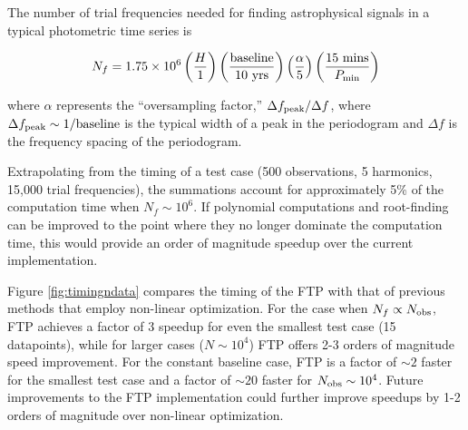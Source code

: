 \documentclass[apj]{emulateapj}
\begin{document}
The number of trial frequencies needed for finding astrophysical signals in a typical photometric time series is

\begin{equation}
    N_f = 1.75 \times 10^6 \left(\frac{H}{1}\right)\left(\frac{{\rm baseline}}{10~{\rm yrs}}\right)\left(\frac{\alpha}{5}\right)\left(\frac{15~{\rm mins}}{P_{\rm min}}\right)
\end{equation}

\noindent where $\alpha$ represents the ``oversampling factor,'' $\Delta f_{\rm peak} / \Delta f$, where $\Delta f_{\rm peak} \sim 1/{\rm baseline}$ is
the typical width of a peak in the periodogram and $\Delta f$ is the frequency spacing of the periodogram.

Extrapolating from the timing of a test case (500 observations, 5 harmonics, 15,000 trial frequencies), the summations
account for approximately 5\% of the computation time when $N_f \sim 10^6$. If polynomial computations and
root-finding can be improved to the point where they no longer dominate the computation time, this would provide an
order of magnitude speedup over the current implementation.

Figure \ref{fig:timingndata} compares the timing of the FTP with that of previous methods that employ
non-linear optimization. For the case when $N_f\propto N_{\rm obs}$, FTP achieves a factor of 3 speedup for even
the smallest test case (15 datapoints), while for larger cases ($N\sim10^4$) FTP offers 2-3 orders of magnitude
speed improvement. For the constant baseline case, FTP is a factor of $\sim 2$ faster for the smallest test case
and a factor of $\sim 20$ faster for $N_{\rm obs}\sim 10^4$. Future improvements to the FTP implementation
could further improve speedups by 1-2 orders of magnitude over non-linear optimization.


%

%
\end{document}
